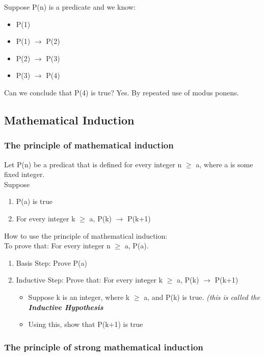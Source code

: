\documentclass{article}
\begin{document}
Suppose P(n) is a predicate and we know:
\begin{itemize}
\item P(1)
\item P(1) $\rightarrow$ P(2)
\item P(2) $\rightarrow$ P(3)
\item P(3) $\rightarrow$ P(4)
\end{itemize}

Can we conclude that P(4) is true? Yes. By repeated use of modus ponens.

\subsection{Mathematical Induction}

\subsubsection{The principle of mathematical induction}

Let P(n) be a predicat that is defined for every integer n $\geq$ a, where a is some fixed integer. \\

Suppose
\begin{enumerate}
\item P(a) is true
\item For every integer k $\geq$ a, P(k) $\rightarrow$ P(k+1)
\end{enumerate}

How to use the principle of mathematical induction: \\

To prove that: For every integer n $\geq$ a, P(a).

\begin{enumerate}
\item Basis Step: Prove P(a)
\item Inductive Step: Prove that: For every integer k $\geq$ a, P(k) $\rightarrow$ P(k+1)
\begin{itemize}
\item Suppose k is an integer, where k $\geq$ a, and P(k) is true. \textit{(this is called the \textbf{Inductive Hypothesis}}
\item Using this, show that P(k+1) is true
\end{itemize}
\end{enumerate}

\subsubsection{The principle of strong mathematical induction}
\end{document}
